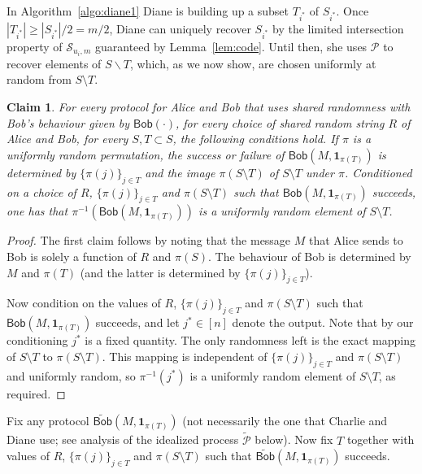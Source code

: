 \documentclass[11pt]{article}
\newtheorem{claim}{Claim}
\newcommand{\query}{\mathsf{Bob}}
\begin{document}
In Algorithm~\ref{algo:diane1} Diane is building up a subset $T_{i^*}$ of $S_{i^*}$. Once $|T_{i^*}| \ge |S_{i^*}|/2 = m/2$, Diane can uniquely recover $S_{i^*}$ by the limited intersection property of $\mathcal{S}_{u_i,m}$ guaranteed by Lemma~\ref{lem:code}. Until then, she uses $\mathcal P$ to recover elements of $S\backslash T$, which, as we now show, are chosen uniformly at random from $S\setminus T$. 

\begin{claim}\label{cl:uniform}
For every protocol for Alice and Bob that uses shared randomness with Bob's behaviour given by $\query(\cdot)$, for every choice of shared random string $R$ of Alice and Bob, for every $S, T\subset S$, the following conditions hold. If $\pi$ is a uniformly random permutation, the success or failure of $\query(M, \mathbf{1}_{\pi(T)})$ is determined by $\{\pi(j)\}_{j\in T}$ and the image $\pi(S\setminus T)$ of $S\setminus T$ under $\pi$. Conditioned on a choice of $R$, $\{\pi(j)\}_{j\in T}$ and $\pi(S\setminus T)$ such that $\query(M, \mathbf{1}_{\pi(T)})$ succeeds, one has that $\pi^{-1}(\query(M, \mathbf{1}_{\pi(T)}))$ is a uniformly random element of $S\setminus T$.
\end{claim}
\begin{proof}
The first claim follows by noting that the message $M$ that Alice sends to Bob is solely a function of $R$ and $\pi(S)$. The behaviour of Bob is determined by $M$ and $\pi(T)$ (and the latter is determined by $\{\pi(j)\}_{j\in T}$).

Now condition on the values of $R$, $\{\pi(j)\}_{j\in T}$ and $\pi(S\setminus T)$ such that  $\query(M, \mathbf{1}_{\pi(T)})$ succeeds, and let $j^*\in [n]$ denote the output. Note that by our conditioning $j^*$ is a fixed quantity. The only randomness left is the exact mapping of $S\setminus T$ to $\pi(S\setminus T)$. This mapping is independent of $\{\pi(j)\}_{j\in T}$ and $\pi(S\setminus T)$ and uniformly random, so $\pi^{-1}(j^*)$ is a uniformly random element of $S\setminus T$, as required.
\end{proof}

Fix any protocol $\widetilde{\query}(M, \mathbf{1}_{\pi(T)})$ (not necessarily the one that Charlie and Diane use; see analysis of the idealized process $\widetilde{\mathcal{P}}$ below). Now fix $T$ together with values of $R$, $\{\pi(j)\}_{j\in T}$ and $\pi(S\setminus T)$ such that  $\widetilde{\query}(M, \mathbf{1}_{\pi(T)})$ succeeds.  

\end{document}
